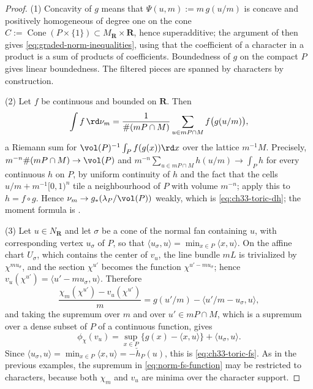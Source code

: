 \begin{proof}
(1)  Concavity of $g$ means that
$\Psi(u,m):=m\,g(u/m)$ is concave and positively homogeneous of degree one
on the cone $C:=\operatorname{Cone}(P\times\{1\})\subset M_{\mathbf
R}\times\mathbf R$, hence superadditive; the argument of
 then gives
\eqref{eq:graded-norm-inequalities}, using that the coefficient of a
character in a product is a sum of products of coefficients.  Boundedness of
$g$ on the compact $P$ gives linear boundedness.  The filtered pieces
are spanned by characters by construction.

(2)  Let $f$ be continuous and bounded on $\mathbf R$.  Then
\[
 \int f\,\rd\nu_m
 =\frac1{\#(mP\cap M)}\sum_{u\in mP\cap M}f\bigl(g(u/m)\bigr),
\]
a Riemann sum for $\vol(P)^{-1}\int_Pf(g(x))\rd x$ over the lattice
$m^{-1}M$.  Precisely, $m^{-n}\#(mP\cap M)\to\vol(P)$ and
$m^{-n}\sum_{u\in mP\cap M}h(u/m)\to\int_Ph$ for every continuous $h$
on $P$, by uniform continuity of $h$ and the fact that the cells
$u/m+m^{-1}[0,1)^n$ tile a neighbourhood of $P$ with volume
$m^{-n}$; apply this to $h=f\circ g$.  Hence
$\nu_m\to g_\ast(\lambda_P/\vol(P))$ weakly, which is
\eqref{eq:ch33-toric-dh}; the moment formula is .

(3)  Let $u\in N_{\mathbf R}$ and let $\sigma$ be a cone of the normal
fan containing $u$, with corresponding vertex $u_\sigma$ of $P$, so
that $\langle u_\sigma,u\rangle=\min_{x\in P}\langle x,u\rangle$.  On the
affine chart $U_\sigma$, which contains the center of $v_u$, the
line bundle $mL$ is trivialized by $\chi^{mu_\sigma}$, and the section
$\chi^{u'}$ becomes the function $\chi^{u'-mu_\sigma}$; hence
$v_u(\chi^{u'})=\langle u'-mu_\sigma,u\rangle$.  Therefore
\[
 \frac{\chi_m(\chi^{u'})-v_u(\chi^{u'})}{m}
 =g(u'/m)-\bigl\langle u'/m-u_\sigma,u\bigr\rangle ,
\]
and taking the supremum over $m$ and over $u'\in mP\cap M$, which is a
supremum over a dense subset of $P$ of a continuous function, gives
\[
 \phi_\chi(v_u)=\sup_{x\in P}\{g(x)-\langle x,u\rangle\}
   +\langle u_\sigma,u\rangle .
\]
Since $\langle u_\sigma,u\rangle=\min_{x\in P}\langle x,u\rangle
=-\check h_P(u)$, this is \eqref{eq:ch33-toric-fs}.  As in the previous
examples, the supremum in \eqref{eq:norm-fs-function} may be restricted to
characters, because both $\chi_m$ and $v_u$ are minima over
the character support.


\end{proof}
